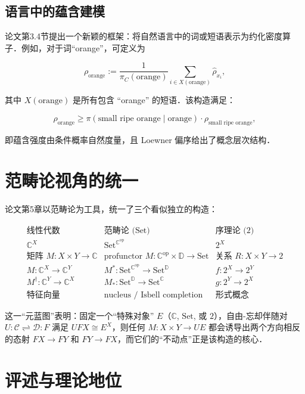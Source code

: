 \documentclass[10pt, openany]{book}
\begin{document}
\subsection{语言中的蕴含建模}

论文第3.4节提出一个新颖的框架：将自然语言中的词或短语表示为约化密度算子．例如，对于词“orange”，可定义为

\[
\rho_{\text{orange}} := \frac{1}{\pi_C(\text{orange})} \sum_{i \in X(\text{orange})} \hat{\rho}_{x_i},
\]

其中 $X(\text{orange})$ 是所有包含 “orange” 的短语．该构造满足：

\[
\rho_{\text{orange}} \ge \pi(\text{small ripe orange} \mid \text{orange}) \cdot \rho_{\text{small ripe orange}},
\]

即蕴含强度由条件概率自然度量，且 Loewner 偏序给出了概念层次结构．

\section{范畴论视角的统一}

论文第5章以范畴论为工具，统一了三个看似独立的构造：

\[
\begin{array}{c|c|c}
\text{线性代数} & \text{范畴论 (Set)} & \text{序理论 (2)} \\
\hline
\mathbb{C}^X & \mathrm{Set}^{\mathbb{C}^{\mathrm{op}}} & 2^X \\
\text{矩阵 } M: X\times Y \to \mathbb{C} & \text{profunctor } M: \mathbb{C}^{\mathrm{op}}\times \mathbb{D} \to \mathrm{Set} & \text{关系 } R: X\times Y \to 2 \\
M: \mathbb{C}^X \to \mathbb{C}^Y & M^*: \mathrm{Set}^{\mathbb{C}^{\mathrm{op}}} \to \mathrm{Set}^{\mathbb{D}} & f: 2^X \to 2^Y \\
M^\dagger: \mathbb{C}^Y \to \mathbb{C}^X & M_*: \mathrm{Set}^{\mathbb{D}} \to \mathrm{Set}^{\mathbb{C}} & g: 2^Y \to 2^X \\
\text{特征向量} & \text{nucleus / Isbell completion} & \text{形式概念}
\end{array}
\]

\noindent
这一“元蓝图”表明：固定一个“特殊对象” $E$（$\mathbb{C}$, $\mathrm{Set}$, 或 $2$），自由-忘却伴随对 $U: \mathcal{C} \rightleftharpoons \mathcal{D}: F$ 满足 $UFX \cong E^X$，则任何 $M: X\times Y \to UE$ 都会诱导出两个方向相反的态射 $FX \to FY$ 和 $FY \to FX$，而它们的“不动点”正是该构造的核心．

\section{评述与理论地位}
\end{document}
